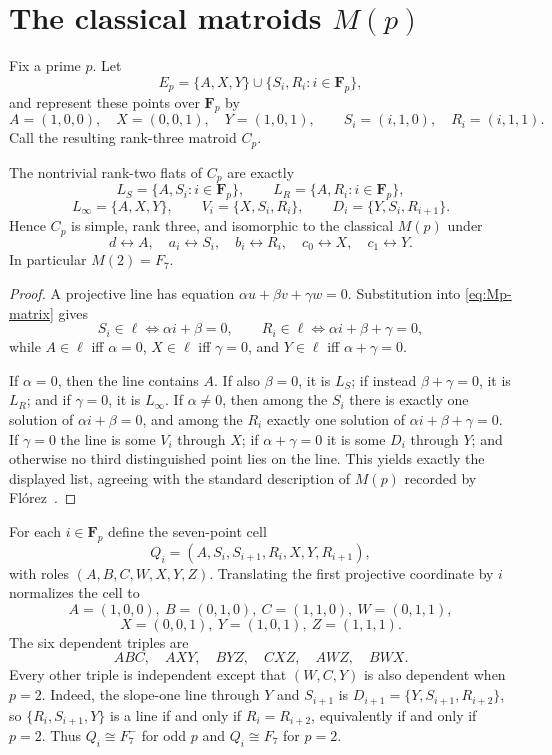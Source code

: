 \documentclass[11pt]{article}
\theoremstyle{definition}
\begin{document}
\section{The classical matroids \texorpdfstring{$M(p)$}{M(p)}}\label{sec:Mp}

Fix a prime $p$.  Let
\[
E_p=\{A,X,Y\}\cup\{S_i,R_i:i\in\mathbf F_p\},
\]
and represent these points over $\mathbf F_p$ by
\begin{equation}\label{eq:Mp-matrix}
A=(1,0,0),\quad X=(0,0,1),\quad Y=(1,0,1),\qquad
S_i=(i,1,0),\quad R_i=(i,1,1).
\end{equation}
Call the resulting rank-three matroid $C_p$.

\begin{proposition}\label{prop:lines}
The nontrivial rank-two flats of $C_p$ are exactly
\[
L_S=\{A,S_i:i\in\mathbf F_p\},\qquad
L_R=\{A,R_i:i\in\mathbf F_p\},
\]
\[
L_\infty=\{A,X,Y\},\qquad
V_i=\{X,S_i,R_i\},\qquad
D_i=\{Y,S_i,R_{i+1}\}.
\]
Hence $C_p$ is simple, rank three, and isomorphic to the classical $M(p)$ under
\[
d\leftrightarrow A,\quad a_i\leftrightarrow S_i,\quad b_i\leftrightarrow R_i,
\quad c_0\leftrightarrow X,\quad c_1\leftrightarrow Y.
\]
In particular $M(2)=F_7$.
\end{proposition}
\begin{proof}
A projective line has equation $\alpha u+\beta v+\gamma w=0$.  Substitution into \eqref{eq:Mp-matrix} gives
\[
S_i\in\ell\iff \alpha i+\beta=0,
\qquad
R_i\in\ell\iff \alpha i+\beta+\gamma=0,
\]
while $A\in\ell$ iff $\alpha=0$, $X\in\ell$ iff $\gamma=0$, and $Y\in\ell$ iff $\alpha+\gamma=0$.

If $\alpha=0$, then the line contains $A$.  If also $\beta=0$, it is $L_S$; if instead $\beta+\gamma=0$, it is $L_R$; and if $\gamma=0$, it is $L_\infty$.  If $\alpha\neq0$, then among the $S_i$ there is exactly one solution of $\alpha i+\beta=0$, and among the $R_i$ exactly one solution of $\alpha i+\beta+\gamma=0$.  If $\gamma=0$ the line is some $V_i$ through $X$; if $\alpha+\gamma=0$ it is some $D_i$ through $Y$; and otherwise no third distinguished point lies on the line.  This yields exactly the displayed list, agreeing with the standard description of $M(p)$ recorded by Fl\'orez~\cite{Florez2006}.
\end{proof}

For each $i\in\mathbf F_p$ define the seven-point cell
\begin{equation}\label{eq:cell}
Q_i=(A,S_i,S_{i+1},R_i,X,Y,R_{i+1}),
\end{equation}
with roles $(A,B,C,W,X,Y,Z)$.  Translating the first projective coordinate by $i$ normalizes the cell to
\[
A=(1,0,0),\ B=(0,1,0),\ C=(1,1,0),\ W=(0,1,1),
\]
\[
X=(0,0,1),\ Y=(1,0,1),\ Z=(1,1,1).
\]
The six dependent triples are
\begin{equation}\label{eq:sixlines}
ABC,\quad AXY,\quad BYZ,\quad CXZ,\quad AWZ,\quad BWX.
\end{equation}
Every other triple is independent except that $(W,C,Y)$ is also dependent when $p=2$.  Indeed, the slope-one line through $Y$ and $S_{i+1}$ is $D_{i+1}=\{Y,S_{i+1},R_{i+2}\}$, so $\{R_i,S_{i+1},Y\}$ is a line if and only if $R_i=R_{i+2}$, equivalently if and only if $p=2$.  Thus $Q_i\cong F_7^-$ for odd $p$ and $Q_i\cong F_7$ for $p=2$.
\end{document}
